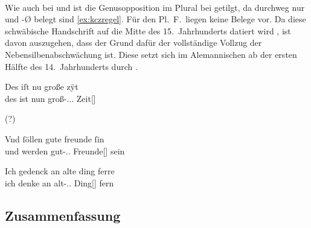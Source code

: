 \paragraph{\citet{kc:Z}} Wie auch bei \citet{kc:H} und \citet{kc:P} ist die
Genusopposition im Plural bei \citet{kc:Z} getilgt, da durchweg nur 
und -Ø belegt sind \cref{ex:kczregel}. Für den Pl.~F.\ liegen keine Belege vor.
Da diese schwäbische Handschrift auf die Mitte des 15.~Jahrhunderts datiert
wird \autocite[32]{wolf:kckat}, ist davon auszugehen, dass der Grund dafür der
vollständige Vollzug der Nebensilbenabschwächung ist. Diese setzt sich im
Alemannischen ab der ersten Hälfte des 14.~Jahrhunderts durch
\autocites(Schwäbisch wird nicht gesondert ausgewiesen)[vgl.][267,
Abb.~A~69]{ksw2}.

\begin{exe}
\ex \label{ex:kczregel}
	\begin{xlist}
	\ex \label{ex:kczregel_1}
		\gll Des iſt nu große zÿt \\
			des ist nun groß-\Nom.\Sg.\FemI.\St{} Zeit[\FemI] \\
		\begin{taggedline}{\parencites[\pno~233\ra, 17]{kc:Z}[zu][11620]{schroeder1895}}
		\trans {} (?)
		\end{taggedline}

	\ex \label{ex:kczregel_2}
		\gll Vnd ſöllen gute freunde ſin \\
			und werden gut-\Nom.\Pl.\St{} Freunde[\MascA] sein \\
		\begin{taggedline}{\parencites[\pno~61\va, 1]{kc:Z}[vgl.][3089]{schroeder1895}}
		\trans {}
		\end{taggedline}

	\ex \label{ex:kczregel_3}
		\gll Ich gedenck an alte ding ferre \\
			ich denke an alt-\Acc.\Pl.\St{} Ding[\NeutI] fern \\
		\begin{taggedline}{\parencites[\pno~135\ra, 9]{kc:Z}[vgl.][6849]{schroeder1895}}
		\trans {}
		\end{taggedline}
	\end{xlist}
\end{exe}

\subsection{Zusammenfassung}

